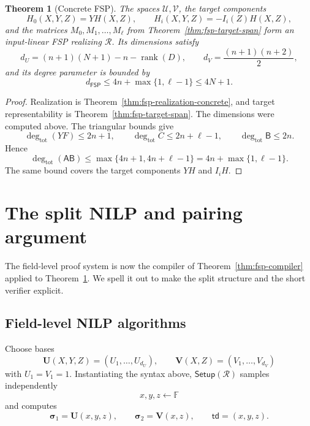 \documentclass[11pt]{article}
\newtheorem{theorem}{Theorem}[section]
\theoremstyle{definition}
\newcommand{\F}{\mathbb F}
\newcommand{\cR}{\mathcal R}
\newcommand{\cU}{\mathcal U}
\newcommand{\cV}{\mathcal V}
\newcommand{\Setup}{\mathsf{Setup}}
\newcommand{\td}{\mathsf{td}}
\newcommand{\FSP}{\mathsf{FSP}}
\begin{document}
\begin{theorem}[Concrete FSP]
\label{thm:concrete-fsp}
The spaces $\cU,\cV$, the target components
\[
  H_0(X,Y,Z)=YH(X,Z),
  \qquad
  H_i(X,Y,Z)=-I_i(Z)H(X,Z),
\]
and the matrices $M_0,M_1,\ldots,M_\ell$ from
Theorem~\ref{thm:fsp-target-span} form an input-linear FSP realizing
$\cR$.  Its dimensions satisfy
\[
  d_U=(n+1)(N+1)-n-\operatorname{rank}(D),
  \qquad
  d_V=\frac{(n+1)(n+2)}2,
\]
and its degree parameter is bounded by
\begin{equation}
  d_{\FSP}
  \le 4n+\max\{1,\ell-1\}
  \le4N+1.
  \label{eq:concrete-fsp-degree}
\end{equation}
\end{theorem}

\begin{proof}
Realization is Theorem~\ref{thm:fsp-realization-concrete}, and target
representability is Theorem~\ref{thm:fsp-target-span}.  The dimensions were computed above.  The triangular bounds give
\[
  \deg_{\mathrm{tot}}(YF)\le2n+1,
  \qquad
  \deg_{\mathrm{tot}}C\le2n+\ell-1,
  \qquad
  \deg_{\mathrm{tot}}\mathsf B\le2n.
\]
Hence
\[
  \deg_{\mathrm{tot}}(\mathsf A\mathsf B)
  \le\max\{4n+1,4n+\ell-1\}
  =4n+\max\{1,\ell-1\}.
\]
The same bound covers the target components $YH$ and $I_iH$.
\end{proof}

\section{The split NILP and pairing argument}
\label{sec:nilp}

The field-level proof system is now the compiler of
Theorem~\ref{thm:fsp-compiler} applied to Theorem~\ref{thm:concrete-fsp}.
We spell it out to make the split structure and the short verifier explicit.

\subsection{Field-level NILP algorithms}

Choose bases
\[
  \mathbf U(X,Y,Z)=(U_1,\ldots,U_{d_U}),
  \qquad
  \mathbf V(X,Z)=(V_1,\ldots,V_{d_V})
\]
with $U_1=V_1=1$.  Instantiating the syntax above, $\Setup(\cR)$ samples
independently
\[
  x,y,z\leftarrow\F
\]
and computes
\begin{equation}
  \boldsymbol{\sigma}_1=\mathbf U(x,y,z),
  \qquad
  \boldsymbol{\sigma}_2=\mathbf V(x,z),
  \qquad
  \td=(x,y,z).
  \label{eq:concrete-nilp-crs}
\end{equation}
\end{document}
